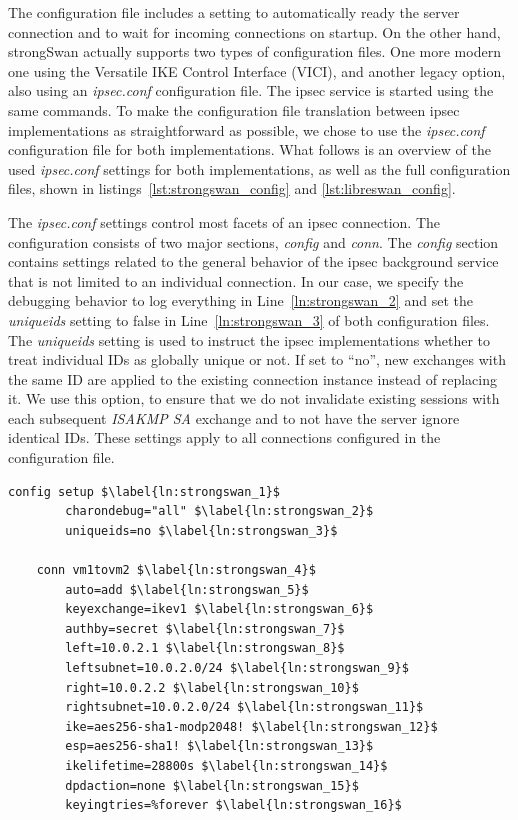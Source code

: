 The configuration file includes a setting to automatically ready the server connection and to wait for incoming connections on startup. On the other hand, strongSwan actually supports two types of configuration files. One more modern one using the Versatile IKE Control Interface (VICI), and another legacy option, also using an \emph{ipsec.conf} configuration file. The \ac{ipsec} service is started using the same commands. To make the configuration file translation between \ac{ipsec} implementations as straightforward as possible, we chose to use the \emph{ipsec.conf} configuration file for both implementations. What follows is an overview of the used \emph{ipsec.conf} settings for both implementations, as well as the full configuration files, shown in listings~\ref{lst:strongswan_config} and \ref{lst:libreswan_config}.

The \emph{ipsec.conf} settings control most facets of an \ac{ipsec} connection. The configuration consists of two major sections, \emph{config} and \emph{conn}. The \emph{config} section contains settings related to the general behavior of the \ac{ipsec} background service that is not limited to an individual connection. In our case, we specify the debugging behavior to log everything in Line~\ref{ln:strongswan_2} and set the \emph{uniqueids} setting to false in Line~\ref{ln:strongswan_3} of both configuration files. The \emph{uniqueids} setting is used to instruct the \ac{ipsec} implementations whether to treat individual IDs as globally unique or not. If set to ``no'', new exchanges with the same ID are applied to the existing connection instance instead of replacing it. We use this option, to ensure that we do not invalidate existing sessions with each subsequent \emph{ISAKMP SA} exchange and to not have the server ignore identical IDs. These settings apply to all connections configured in the configuration file.

\begin{lstlisting}[mathescape=true, float=ht, caption=Configuration options of the strongSwan server., label=lst:strongswan_config]
	config setup $\label{ln:strongswan_1}$
		charondebug="all" $\label{ln:strongswan_2}$
		uniqueids=no $\label{ln:strongswan_3}$
	
	conn vm1tovm2 $\label{ln:strongswan_4}$
		auto=add $\label{ln:strongswan_5}$
		keyexchange=ikev1 $\label{ln:strongswan_6}$
		authby=secret $\label{ln:strongswan_7}$
		left=10.0.2.1 $\label{ln:strongswan_8}$
		leftsubnet=10.0.2.0/24 $\label{ln:strongswan_9}$
		right=10.0.2.2 $\label{ln:strongswan_10}$
		rightsubnet=10.0.2.0/24 $\label{ln:strongswan_11}$
		ike=aes256-sha1-modp2048! $\label{ln:strongswan_12}$
		esp=aes256-sha1! $\label{ln:strongswan_13}$
		ikelifetime=28800s $\label{ln:strongswan_14}$
		dpdaction=none $\label{ln:strongswan_15}$
		keyingtries=%forever $\label{ln:strongswan_16}$
\end{lstlisting}


